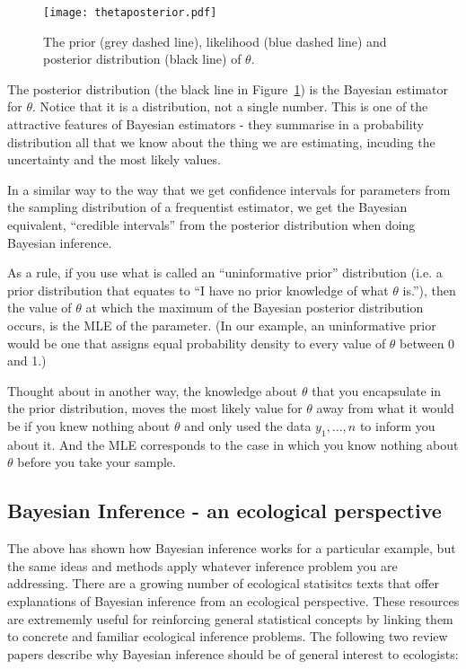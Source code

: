 \begin{figure}[ht!]
\caption{\small The prior (grey dashed line), likelihood (blue dashed line) and posterior distribution (black line) of $\theta$.}
\centering
\texttt{[image: thetaposterior.pdf]}
\label{fig:thetaposterior}
\end{figure}
\nonumber

The posterior distribution (the black line in Figure~\ref{fig:thetaposterior}) is the Bayesian estimator for $\theta$. Notice that it is a distribution, not a single number. This is one of the attractive features of Bayesian estimators - they summarise in a probability distribution all that we know about the thing we are estimating, incuding the uncertainty and the most likely values. 

\een

In a similar way to the way that we get confidence intervals for parameters from the sampling distribution of a frequentist estimator, we get the Bayesian equivalent, ``credible intervals'' from the posterior distribution when doing Bayesian inference.

As a rule, if you use what is called an ``uninformative prior'' distribution (i.e. a prior distribution that equates to ``I have no prior knowledge of what $\theta$ is.''), then the value of $\theta$ at which the maximum of the Bayesian posterior distribution occurs, is the MLE of the parameter. (In our example, an uninformative prior would be one that assigns equal probability density to every value of $\theta$ between 0 and 1.)

Thought about in another way, the knowledge about $\theta$ that you encapsulate in the prior distribution, moves the most likely value for $\theta$ away from what it would be if you knew nothing about $\theta$ and only used the data $y_1,\ldots,n$ to inform you about it. And the MLE corresponds to the case in which you know nothing about $\theta$ before you take your sample.

\subsection{Bayesian Inference - an ecological perspective}

The above has shown how Bayesian inference works for a particular example, but the same ideas and methods apply whatever inference problem you are addressing. There are a growing number of ecological statisitcs texts that offer explanations of Bayesian inference from an ecological perspective. These resources are extrememly useful for reinforcing general statistical concepts by linking them to concrete and familiar ecological inference problems. 
The following two review papers describe why Bayesian inference should be of general interest to ecologists:

